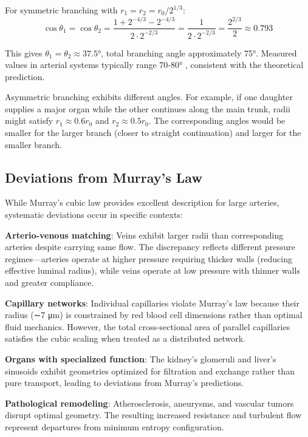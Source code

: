For symmetric branching with $r_{1} = r_{2} = r_{0}/2^{1/3}$:
\begin{equation}
\cos \theta_{1} = \cos \theta_{2} = \frac{1 + 2^{-4/3} - 2^{-4/3}}{2 \cdot 2^{-2/3}} = \frac{1}{2 \cdot 2^{-2/3}} = \frac{2^{2/3}}{2} \approx 0.793
\end{equation}

This gives $\theta_{1} = \theta_{2} \approx 37.5°$, total branching angle approximately 75°. Measured values in arterial systems typically range 70-80° \cite{zamir1976optimality}, consistent with the theoretical prediction.

Asymmetric branching exhibits different angles. For example, if one daughter supplies a major organ while the other continues along the main trunk, radii might satisfy $r_{1} \approx 0.6r_{0}$ and $r_{2} \approx 0.5r_{0}$. The corresponding angles would be smaller for the larger branch (closer to straight continuation) and larger for the smaller branch.

\subsection{Deviations from Murray's Law}

While Murray's cubic law provides excellent description for large arteries, systematic deviations occur in specific contexts:

\textbf{Arterio-venous matching}: Veins exhibit larger radii than corresponding arteries despite carrying same flow. The discrepancy reflects different pressure regimes—arteries operate at higher pressure requiring thicker walls (reducing effective luminal radius), while veins operate at low pressure with thinner walls and greater compliance.

\textbf{Capillary networks}: Individual capillaries violate Murray's law because their radius (∼7 μm) is constrained by red blood cell dimensions rather than optimal fluid mechanics. However, the total cross-sectional area of parallel capillaries satisfies the cubic scaling when treated as a distributed network.

\textbf{Organs with specialized function}: The kidney's glomeruli and liver's sinusoids exhibit geometries optimized for filtration and exchange rather than pure transport, leading to deviations from Murray's predictions.

\textbf{Pathological remodeling}: Atherosclerosis, aneurysms, and vascular tumors disrupt optimal geometry. The resulting increased resistance and turbulent flow represent departures from minimum entropy configuration.

